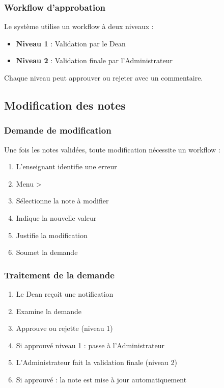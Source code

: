 \subsubsection{Workflow d'approbation}

Le système utilise un workflow à deux niveaux :

\begin{itemize}[leftmargin=*]
    \item \textbf{Niveau 1} : Validation par le Dean
    \item \textbf{Niveau 2} : Validation finale par l'Administrateur
\end{itemize}

Chaque niveau peut approuver ou rejeter avec un commentaire.

\subsection{Modification des notes}

\subsubsection{Demande de modification}

Une fois les notes validées, toute modification nécessite un workflow :

\begin{enumerate}[leftmargin=*]
    \item L'enseignant identifie une erreur
    \item Menu  > 
    \item Sélectionne la note à modifier
    \item Indique la nouvelle valeur
    \item Justifie la modification
    \item Soumet la demande
\end{enumerate}

\subsubsection{Traitement de la demande}

\begin{enumerate}[leftmargin=*]
    \item Le Dean reçoit une notification
    \item Examine la demande
    \item Approuve ou rejette (niveau 1)
    \item Si approuvé niveau 1 : passe à l'Administrateur
    \item L'Administrateur fait la validation finale (niveau 2)
    \item Si approuvé : la note est mise à jour automatiquement
\end{enumerate}


